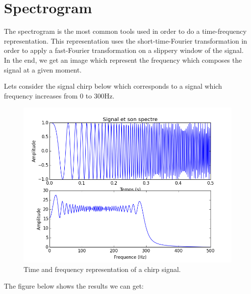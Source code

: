 
\chapter{Spectrogram}

The spectrogram is the most common tools used in order to do a time-frequency representation. This representation uses the short-time-Fourier transformation in order to apply a fast-Fourier transformation on a slippery window of the signal. In the end, we get an image which represent the frequency which composes the signal at a given moment.

Lets consider the signal chirp below which corresponds to a signal which frequency increases from 0 to 300Hz.

\begin{figure}[H]
\centering
    \includegraphics[scale=0.6,angle=0]{Images/ChirpTF.png}
    \caption{Time and frequency representation of a chirp signal.}
    \label{fig:ChirpTF}
\end{figure}

The figure below shows the results we can get:

